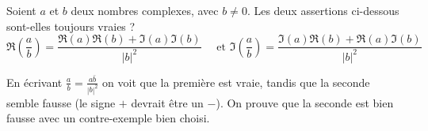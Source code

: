 \begin{exo}
Soient $a$ et $b$ deux nombres complexes, avec $b\neq 0$. Les deux assertions ci-dessous sont-elles toujours vraies ?
\[
\Re\left(\frac{a}{b}\right) = \frac{\Re(a)\Re(b)+\Im(a)\Im(b)}{|b|^2}
\quad\text{ et }
\Im\left(\frac{a}{b}\right) = \frac{\Im(a)\Re(b)+\Re(a)\Im(b)}{|b|^2}
\]
\begin{sol}
En écrivant $\frac{a}{b} = \frac{a\bar b}{|b|^2}$ on voit que la première est vraie, tandis que la seconde semble fausse (le signe $+$ devrait être un $-$). On prouve que la seconde est bien fausse avec un contre-exemple bien choisi.
\end{sol}
\end{exo}





